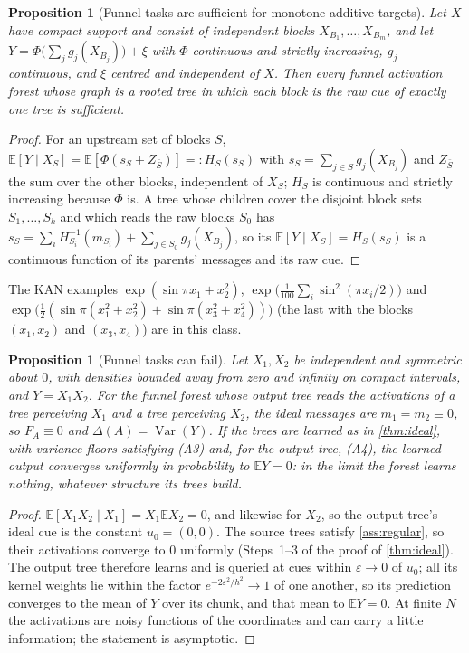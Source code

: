 \documentclass[11pt]{article}
\newtheorem{proposition}[theorem]{Proposition}
\theoremstyle{definition}
\theoremstyle{remark}
\newcommand{\E}{\mathbb{E}}
\newcommand{\Var}{\operatorname{Var}}
\begin{document}
\begin{proposition}[Funnel tasks are sufficient for monotone-additive targets]\label{prop:suffclass}
Let $X$ have compact support and consist of independent blocks $X_{B_1},\dots,X_{B_m}$, and let
$Y=\Phi\bigl(\sum_jg_j(X_{B_j})\bigr)+\xi$ with $\Phi$ continuous and strictly increasing,
$g_j$ continuous, and $\xi$ centred and independent of $X$.  Then every funnel
activation forest whose graph is a rooted tree in which each block is the raw cue of
exactly one tree is sufficient.
\end{proposition}
\begin{proof}
For an upstream set of blocks $S$, $\E[Y\mid X_S]=\E[\Phi(s_S+Z_{\bar S})]=:H_S(s_S)$ with
$s_S=\sum_{j\in S}g_j(X_{B_j})$ and $Z_{\bar S}$ the sum over the other blocks, independent
of $X_S$; $H_S$ is continuous and strictly increasing because $\Phi$ is.  A tree whose
children cover the disjoint block sets $S_1,\dots,S_k$ and which reads the raw blocks $S_0$
has $s_S=\sum_iH_{S_i}^{-1}(m_{S_i})+\sum_{j\in S_0}g_j(X_{B_j})$, so its
$\E[Y\mid X_S]=H_S(s_S)$ is a continuous function of its parents' messages and its raw
cue.
\end{proof}

The KAN examples $\exp(\sin\pi x_1+x_2^2)$, $\exp\bigl(\tfrac1{100}\sum_i\sin^2(\pi x_i/2)\bigr)$
and $\exp\bigl(\tfrac12(\sin\pi(x_1^2+x_2^2)+\sin\pi(x_3^2+x_4^2))\bigr)$ (the last with
the blocks $(x_1,x_2)$ and $(x_3,x_4)$) are in this class.

\begin{proposition}[Funnel tasks can fail]\label{prop:xy}
Let $X_1,X_2$ be independent and symmetric about $0$, with densities bounded away from
zero and infinity on compact intervals, and $Y=X_1X_2$.  For the funnel forest whose output tree reads
the activations of a tree perceiving $X_1$ and a tree perceiving $X_2$, the ideal
messages are $m_1=m_2\equiv0$, so $F_A\equiv0$ and $\Delta(A)=\Var(Y)$.  If the trees are
learned as in \cref{thm:ideal}, with variance floors satisfying (A3) and, for the output
tree, (A4),
the learned output converges uniformly in probability to $\E Y=0$: in the limit the
forest learns nothing, whatever structure its trees build.
\end{proposition}
\begin{proof}
$\E[X_1X_2\mid X_1]=X_1\E X_2=0$, and likewise for $X_2$, so the output tree's ideal cue
is the constant $u_0=(0,0)$.  The source trees satisfy \cref{ass:regular}, so their
activations converge to $0$ uniformly (Steps~1--3 of the proof of \cref{thm:ideal}).  The
output tree therefore learns and is queried at cues within $\varepsilon\to0$ of $u_0$;
all its kernel weights lie within the factor $e^{-2\varepsilon^2/h^2}\to1$ of one another,
so its prediction converges to the mean of $Y$ over its chunk, and that mean to $\E Y=0$.
At finite $N$ the activations are noisy functions of the coordinates and can carry a
little information; the statement is asymptotic.
\end{proof}
\end{document}
